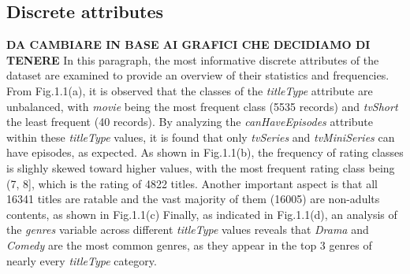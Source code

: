 \subsection{Discrete attributes}
\textbf{DA CAMBIARE IN BASE AI GRAFICI CHE DECIDIAMO DI TENERE}
In this paragraph, the most informative discrete attributes of the dataset are examined to provide an overview of their statistics and frequencies. \\
From Fig.1.1(a), it is observed that the classes of the \textit{titleType} attribute are unbalanced, with \textit{movie} being the most frequent class (5535 records) and \textit{tvShort} the least frequent (40 records). 
By analyzing the \textit{canHaveEpisodes} attribute within these \textit{titleType} values, it is found that only \textit{tvSeries} and \textit{tvMiniSeries} can have episodes, as expected.
As shown in Fig.1.1(b), the frequency of rating classes is slighly skewed toward higher values, with the most frequent rating class being (7, 8], which is the rating of 4822 titles.
Another important aspect is that all 16341 titles are ratable and the vast majority of them (16005) are non-adults contents, as shown in Fig.1.1(c)
Finally, as indicated in Fig.1.1(d), an analysis of the \textit{genres} variable across different \textit{titleType} values reveals that \textit{Drama} and \textit{Comedy} are the most common genres, as they appear in the top 3 genres of nearly every \textit{titleType} category.
